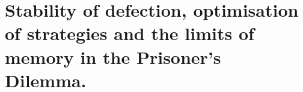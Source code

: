 
\chapter{Stability of defection, optimisation of strategies and the limits of
       memory in the Prisoner's Dilemma.}\label{chapter:memory_one}








